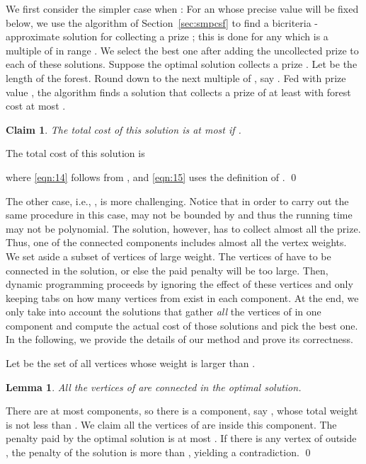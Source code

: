 \documentclass[extras,11pt]{article} \usepackage{fullpage}
\theoremstyle{mytheorem}
\newtheorem{claim}[theorem]{Claim}
\newtheorem{lemma}[theorem]{Lemma}
\renewenvironment{proof}{\par\noindent{\bf Proof.}\hspace{0.5em}}
    {\hfill\qed\vspace{1ex}}
\begin{document}
We first consider the simpler case when :
For an  whose precise value will be fixed below,
we use the algorithm of Section~\ref{sec:smpcsf} to find
a bicriteria -approximate solution for collecting
a prize ; this is done for any  which is a multiple of 
in range .
We select the best one after adding the uncollected prize to each
of these solutions.
Suppose the optimal solution  collects a prize .
Let  be the length of the forest.
Round  down to the next multiple of , say .
Fed with prize value , the algorithm finds a solution that collects
a prize of at least  with forest cost at most .
\begin{claim}\label{clm:mpcsf:eps}
The total cost of this solution is at most  if .
\end{claim}

\begin{proof} The total cost of this solution is

where \eqref{eqn:14} follows from ,
and \eqref{eqn:15} uses the definition of .
\end{proof}





The other case, i.e., , is more challenging.
Notice that in order to carry out the same procedure in this case,  may not be bounded by  and thus the running time may not be polynomial.
The solution, however, has to collect almost all the prize.
Thus, one of the connected components includes almost all the vertex weights.
We set aside a subset  of vertices of large weight.
The vertices of  have to be connected in the solution, or else the paid penalty will be too large. Then, dynamic programming proceeds by ignoring the effect of these vertices and only keeping tabs on how many vertices from  exist in each component.
At the end, we only take into account the solutions that gather \emph{all} the vertices of  in one component and compute the actual cost of those solutions and pick the best one.
In the following, we provide the details of our method and prove its correctness.

Let  be the set of all vertices whose weight is larger than .
\begin{lemma}\label{lem:large-comp}
All the vertices of  are connected in the optimal solution.
\end{lemma}
\begin{proof}
  There are at most  components, so there is a component, say ,
 whose total weight is not less than .
  We claim all the vertices of  are inside this component.
  The penalty paid by the optimal solution is at most .
  If there is any vertex of  outside , the penalty of
 the solution is more than ,
 yielding a contradiction.
\end{proof}
\end{document}
